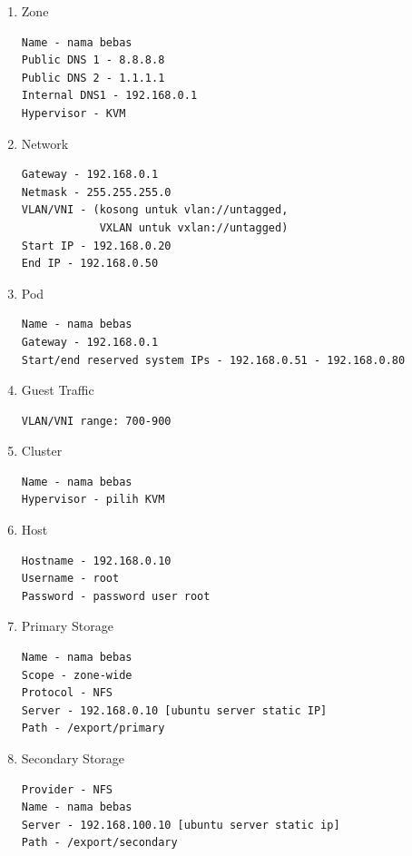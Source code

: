 \begin{enumerate}
    \item Zone
    \begin{verbatim}
Name - nama bebas
Public DNS 1 - 8.8.8.8
Public DNS 2 - 1.1.1.1
Internal DNS1 - 192.168.0.1
Hypervisor - KVM
    \end{verbatim}

    \item Network
    \begin{verbatim}
Gateway - 192.168.0.1
Netmask - 255.255.255.0
VLAN/VNI - (kosong untuk vlan://untagged, 
            VXLAN untuk vxlan://untagged)
Start IP - 192.168.0.20
End IP - 192.168.0.50
    \end{verbatim}

    \item Pod
    \begin{verbatim}
Name - nama bebas
Gateway - 192.168.0.1
Start/end reserved system IPs - 192.168.0.51 - 192.168.0.80
    \end{verbatim}

    \item Guest Traffic
    \begin{verbatim}
VLAN/VNI range: 700-900
    \end{verbatim}

    \item Cluster
    \begin{verbatim}
Name - nama bebas
Hypervisor - pilih KVM
    \end{verbatim}

    \item Host
    \begin{verbatim}
Hostname - 192.168.0.10
Username - root
Password - password user root
    \end{verbatim}

    \item Primary Storage
    \begin{verbatim}
Name - nama bebas
Scope - zone-wide
Protocol - NFS
Server - 192.168.0.10 [ubuntu server static IP]
Path - /export/primary
    \end{verbatim}
    
    \item Secondary Storage
    \begin{verbatim}
Provider - NFS
Name - nama bebas
Server - 192.168.100.10 [ubuntu server static ip]
Path - /export/secondary
    \end{verbatim}
\end{enumerate}

